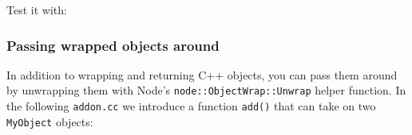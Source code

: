 Test it with:

\begin{Shaded}
\begin{Highlighting}[]
 \NormalTok{(}\NormalTok{);}

 \NormalTok{(}\NormalTok{);}
\NormalTok{( }\NormalTok{() ); }
\NormalTok{( }\NormalTok{() ); }
\NormalTok{( }\NormalTok{() ); }

 \NormalTok{(}\NormalTok{);}
\NormalTok{( }\NormalTok{() ); }
\NormalTok{( }\NormalTok{() ); }
\NormalTok{( }\NormalTok{() ); }
\end{Highlighting}
\end{Shaded}

\subsubsection{Passing wrapped objects
around}\label{passing-wrapped-objects-around}

In addition to wrapping and returning C++ objects, you can pass them
around by unwrapping them with Node's \texttt{node::ObjectWrap::Unwrap}
helper function. In the following \texttt{addon.cc} we introduce a
function \texttt{add()} that can take on two \texttt{MyObject} objects:

